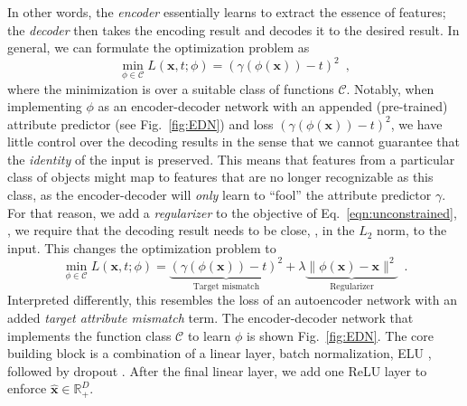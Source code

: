 \documentclass[10pt,twocolumn,letterpaper]{article}
\begin{document}
In other words, the \emph{encoder} essentially learns to extract
the essence of features; the \emph{decoder}
then takes the encoding result and decodes it to the desired result. In
general, we can formulate the optimization problem as
\begin{equation}
\min_{\phi \in \mathcal{C}} L(\mathbf{x},t; \phi) = (\gamma(\phi(\mathbf{x}))-t)^2\enspace,
\label{eqn:unconstrained}
\end{equation}
where the minimization is 
over a suitable class of functions $\mathcal{C}$. Notably, when 
implementing $\phi$ as an encoder-decoder network with an 
appended (pre-trained) attribute predictor (see Fig.~\ref{fig:EDN})
and loss $(\gamma(\phi(\mathbf{x}))-t)^2$, we have little control 
over the decoding results in the sense that we cannot guarantee 
that the \emph{identity} of the input is preserved. This means
that features from a particular class of objects might map to 
features that are no longer recognizable as
this class, as the encoder-decoder will \emph{only} learn to ``fool'' the 
attribute predictor $\gamma$.
For that reason, we add a \emph{regularizer} to the objective
of Eq.~\eqref{eqn:unconstrained}, \ie, we require that the 
decoding result needs to be close, \eg, in the $L_2$ norm, to the
input. This changes the optimization problem to
\begin{equation}
\min_{\phi \in \mathcal{C}} L(\mathbf{x},t; \phi) = \underbrace{(\gamma(\phi(\mathbf{x}))-t)^2}_\text{Target mismatch} + 
\lambda \underbrace{\| \phi(\mathbf{x}) - \mathbf{x} \|^2}_{\text{Regularizer}}
\enspace.
\label{eqn:constrained}
\end{equation}
Interpreted differently, this resembles the loss of an autoencoder 
network with an added \emph{target attribute mismatch} term. 
The encoder-decoder network that implements the function class $\mathcal{C}$ 
to learn $\phi$ is shown Fig.~\ref{fig:EDN}. 
The core building block is a combination of a linear layer, 
batch normalization, ELU \cite{Clevert16a}, followed by dropout 
\cite{Srivastava14a}. After the final linear
layer, we add one ReLU layer to enforce $\hat{\mathbf{x}} \in \mathbb{R}^D_+$.
\end{document}
